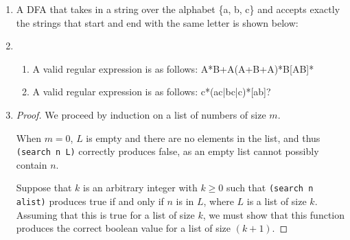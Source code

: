 \documentclass[11pt, notitlepage, leqno]{article}
\begin{document}
\begin{enumerate}
\item A DFA that takes in a string over the alphabet \{a, b, c\} and accepts exactly the strings that start and end with the same letter is shown below:
\begin{center}
\end{center}


\item \begin{enumerate}

\item A valid regular expression is as follows: A*B+A(A+B+A)*B[AB]*

\item A valid regular expression is as follows: c*(ac|bc|c)*[ab]?

\end{enumerate}

\item \begin{proof}
We proceed by induction on a list of numbers of size $m$.

When $m=0$, $L$ is empty and there are no elements in the list, and thus \texttt{(search n L)} correctly produces false, as an empty list cannot possibly contain $n$.

Suppose that $k$ is an arbitrary integer with $k \geq 0$ such that \texttt{(search n alist)}  produces true if and only if $n$ is in $L$, where $L$ is a list of size $k$. Assuming that this is true for a list of size $k$, we must show that this function produces the correct boolean value for a list of size $(k+1)$.


\end{proof}
\end{enumerate}
\end{document}
